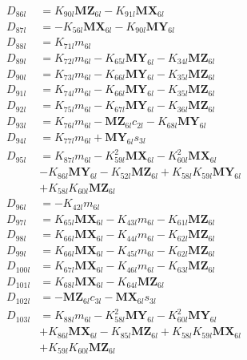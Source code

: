 \begin{multicols}{2}
\begin{align}
D_{86l} &= K_{90l}\mathbf{MZ}_{6l} - K_{91l}\mathbf{MX}_{6l} \nonumber \\
D_{87l} &= - K_{56l}\mathbf{MX}_{6l} - K_{90l}\mathbf{MY}_{6l} \nonumber \\
D_{88l} &= K_{71l}m_{6l} \nonumber \\
D_{89l} &= K_{72l}m_{6l} - K_{65l}\mathbf{MY}_{6l} - K_{34l}\mathbf{MZ}_{6l} \nonumber \\
D_{90l} &= K_{73l}m_{6l} - K_{66l}\mathbf{MY}_{6l} - K_{35l}\mathbf{MZ}_{6l} \nonumber \\
D_{91l} &= K_{74l}m_{6l} - K_{66l}\mathbf{MY}_{6l} - K_{35l}\mathbf{MZ}_{6l} \nonumber \\
D_{92l} &= K_{75l}m_{6l} - K_{67l}\mathbf{MY}_{6l} - K_{36l}\mathbf{MZ}_{6l} \nonumber \\
D_{93l} &= K_{76l}m_{6l} - \mathbf{MZ}_{6l}c_{2l} - K_{68l}\mathbf{MY}_{6l} \nonumber \\
D_{94l} &= K_{77l}m_{6l} + \mathbf{MY}_{6l}s_{3l} \nonumber \\
D_{95l} &= K_{87l}m_{6l} - K_{59l}^2\mathbf{MX}_{6l} - K_{60l}^2\mathbf{MX}_{6l}  \nonumber \\
&- K_{86l}\mathbf{MY}_{6l} - K_{52l}\mathbf{MZ}_{6l} + K_{58l}K_{59l}\mathbf{MY}_{6l}  \nonumber \\
&+ K_{58l}K_{60l}\mathbf{MZ}_{6l} \nonumber \\
D_{96l} &= -K_{42l}m_{6l} \nonumber \\
D_{97l} &= K_{65l}\mathbf{MX}_{6l} - K_{43l}m_{6l} - K_{61l}\mathbf{MZ}_{6l} \nonumber \\
D_{98l} &= K_{66l}\mathbf{MX}_{6l} - K_{44l}m_{6l} - K_{62l}\mathbf{MZ}_{6l} \nonumber \\
D_{99l} &= K_{66l}\mathbf{MX}_{6l} - K_{45l}m_{6l} - K_{62l}\mathbf{MZ}_{6l} \nonumber \\
D_{100l} &= K_{67l}\mathbf{MX}_{6l} - K_{46l}m_{6l} - K_{63l}\mathbf{MZ}_{6l} \nonumber \\
D_{101l} &= K_{68l}\mathbf{MX}_{6l} - K_{64l}\mathbf{MZ}_{6l} \nonumber \\
D_{102l} &= - \mathbf{MZ}_{6l}c_{3l} - \mathbf{MX}_{6l}s_{3l} \nonumber \\
D_{103l} &= K_{88l}m_{6l} - K_{58l}^2\mathbf{MY}_{6l} - K_{60l}^2\mathbf{MY}_{6l}  \nonumber \\
&+ K_{86l}\mathbf{MX}_{6l} - K_{85l}\mathbf{MZ}_{6l} + K_{58l}K_{59l}\mathbf{MX}_{6l}  \nonumber \\
&+ K_{59l}K_{60l}\mathbf{MZ}_{6l} \nonumber \\

\end{align}
\end{multicols}
